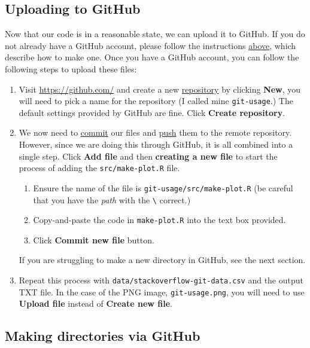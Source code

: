 \documentclass[11pt,onecolumn]{scrartcl}
\begin{document}
\subsection{Uploading to GitHub}
\label{sec:orgb2697f6}

Now that our code is in a reasonable state, we can upload it to GitHub. If you
do not already have a GitHub account, please follow the instructions \hyperref[sec:org0ec21f9]{above},
which describe how to make one. Once you have a GitHub account, you can follow
the following steps to upload these files:

\begin{enumerate}
\item Visit \url{https://github.com/} and create a new \hyperref[sec:org95d76c9]{repository} by clicking \textbf{New}, you
will need to pick a name for the repository (I called mine \texttt{git-usage}.) The
default settings provided by GitHub are fine. Click \textbf{Create repository}.
\item We now need to \hyperref[sec:org84683a9]{commit} our files and \hyperref[sec:org6bea1ab]{push} them to the remote repository.
However, since we are doing this through GitHub, it is all combined into a
single step. Click \textbf{Add file} and then \textbf{creating a new file} to start the
process of adding the \texttt{src/make-plot.R} file.
\begin{enumerate}
\item Ensure the name of the file is \texttt{git-usage/src/make-plot.R} (be careful
that you have the \emph{path} with the \texttt{\textbackslash{}} correct.)
\item Copy-and-paste the code in \texttt{make-plot.R} into the text box provided.
\item Click \textbf{Commit new file} button.
\end{enumerate}
If you are struggling to make a new directory in GitHub, see the next
section.
\item Repeat this process with \texttt{data/stackoverflow-git-data.csv} and the output TXT
file. In the case of the PNG image, \texttt{git-usage.png}, you will need to use
\textbf{Upload file} instead of \textbf{Create new file}.
\end{enumerate}

\subsection{Making directories via GitHub}
\label{sec:orge878a65}
\end{document}
